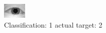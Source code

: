 \begin{figure}[h!]
\begin{center}
\includegraphics[width=0.60\columnwidth]{figures/ID930_class_1_target_2.png}
\end{center}
\caption{ Classification: 1 actual target: 2}
\label{fig:ID930_class_1_target_2}
\end{figure}
